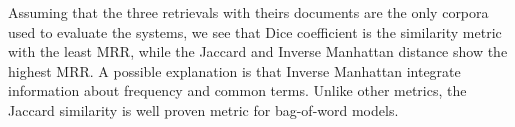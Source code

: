 \documentclass{article}
\begin{document}
Assuming that the three retrievals with theirs documents are the only corpora used to evaluate the systems, we see that Dice coefficient is the similarity metric with the least MRR, while the Jaccard and Inverse Manhattan distance show the highest MRR. A possible explanation is that Inverse Manhattan integrate information about frequency and common terms. Unlike other metrics, the Jaccard similarity is well proven metric for bag-of-word models.
\end{document}
